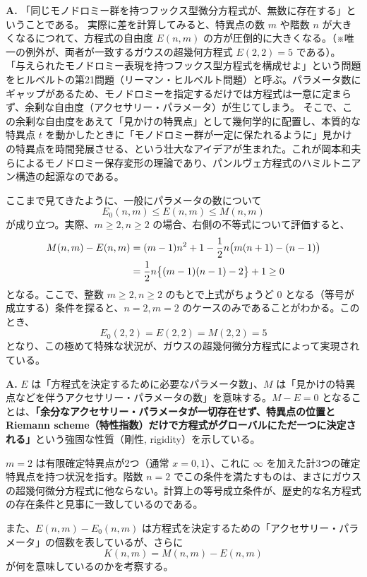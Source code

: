 \begin{Q}
\textbf{A.} 「同じモノドロミー群を持つフックス型微分方程式が、無数に存在する」ということである。
実際に差を計算してみると、特異点の数 $m$ や階数 $n$ が大きくなるにつれて、方程式の自由度 $E(n,m)$ の方が圧倒的に大きくなる。（※唯一の例外が、両者が一致するガウスの超幾何方程式 $E(2,2)=5$ である）。
「与えられたモノドロミー表現を持つフックス型方程式を構成せよ」という問題をヒルベルトの第21問題（リーマン・ヒルベルト問題）と呼ぶ。パラメータ数にギャップがあるため、モノドロミーを指定するだけでは方程式は一意に定まらず、余剰な自由度（アクセサリー・パラメータ）が生じてしまう。
そこで、この余剰な自由度をあえて「見かけの特異点」として幾何学的に配置し、本質的な特異点 $t$ を動かしたときに「モノドロミー群が一定に保たれるように」見かけの特異点を時間発展させる、という壮大なアイデアが生まれた。これが岡本和夫らによるモノドロミー保存変形の理論であり、パンルヴェ方程式のハミルトニアン構造の起源なのである。
\end{Q}

ここまで見てきたように、一般にパラメータの数について
\[
E_{0}(n,m) \le E(n,m) \le M(n,m)
\]
が成り立つ。実際、$m \ge 2, n \ge 2$ の場合、右側の不等式について評価すると、
\begin{align}
M(n,m)-E(n,m) &= (m-1)n^{2} + 1-\frac{1}{2}n \big( m(n+1) - (n-1) \big) \notag \\
&= \frac{1}{2}n \big\{ (m-1)(n-1)-2 \big\} + 1 \ge 0
\end{align}
となる。ここで、整数 $m \ge 2, n \ge 2$ のもとで上式がちょうど $0$ となる（等号が成立する）条件を探ると、$n=2, m=2$ のケースのみであることがわかる。このとき、
\[
E_{0}(2,2)=E(2,2)=M(2,2)=5
\]
となり、この極めて特殊な状況が、ガウスの超幾何微分方程式によって実現されている。

\begin{Q}[【核心】$E(n,m)=M(n,m)$ が成り立つ（$n=2, m=2$）ということは、微分方程式論において何を意味しているのか？なぜそれがガウスの超幾何微分方程式に結びつくのか？]
\textbf{A.} $E$ は「方程式を決定するために必要なパラメータ数」、$M$ は「見かけの特異点などを伴うアクセサリー・パラメータの数」を意味する。$M - E = 0$ となることは、\textbf{「余分なアクセサリー・パラメータが一切存在せず、特異点の位置とRiemann scheme（特性指数）だけで方程式がグローバルにただ一つに決定される」}という強固な性質（剛性, rigidity）を示している。

$m=2$ は有限確定特異点が2つ（通常 $x=0, 1$）、これに $\infty$ を加えた計3つの確定特異点を持つ状況を指す。階数 $n=2$ でこの条件を満たすものは、まさにガウスの超幾何微分方程式に他ならない。計算上の等号成立条件が、歴史的な名方程式の存在条件と見事に一致しているのである。
\end{Q}
また、$E(n,m)-E_{0}(n,m)$ は方程式を決定するための「アクセサリー・パラメータ」の個数を表しているが、さらに
\[
K(n,m)=M(n,m)-E(n,m)
\]
が何を意味しているのかを考察する。

